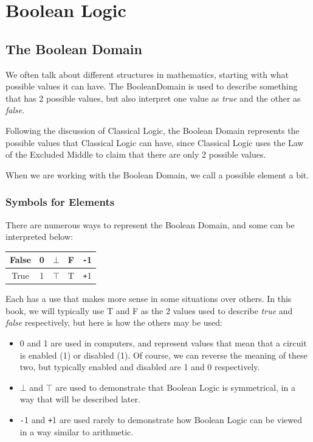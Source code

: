 \chapter{Boolean Logic}
\section{The Boolean Domain}
We often talk about different structures in mathematics, starting with what possible values it can have. The \gls{BooleanDomain} is used to describe something that has 2 possible values, but also interpret
one value as \emph{true} and the other as \emph{false}.

Following the discussion of Classical Logic, the Boolean Domain represents the possible values that Classical Logic can have, since Classical Logic uses the Law of the Excluded Middle to claim that there
are only 2 possible values.

When we are working with the Boolean Domain, we call a possible element a \gls{bit}.
\subsection{Symbols for Elements}
There are numerous ways to represent the Boolean Domain, and some can be interpreted below:
\begin{table}[ht]
\centering
\begin{tabular}{|c|c|c|c|c|}
    \hline
    False & 0 & $\bot$ & F & \texttt{-}1 \\ \hline
    True  & 1 & $\top$ & T & \texttt{+}1 \\ \hline
\end{tabular}
\end{table}

Each has a use that makes more sense in some situations over others. In this book, we will typically use T and F as the 2 values used to describe \emph{true} and \emph{false} respectively, but here is how the others may be used:

\begin{itemize}
    \item 0 and 1 are used in computers, and represent values that mean that a circuit is enabled (1) or disabled (1). Of course, we can reverse the meaning of these two, but typically enabled and disabled are 1 and 0 respectively.
    
    \item $\bot$ and $\top$ are used to demonstrate that Boolean Logic is symmetrical, in a way that will be described later.
    
    \item \texttt{-}1 and \texttt{+}1 are used rarely to demonstrate how Boolean Logic can be viewed in a way similar to arithmetic.
\end{itemize}

